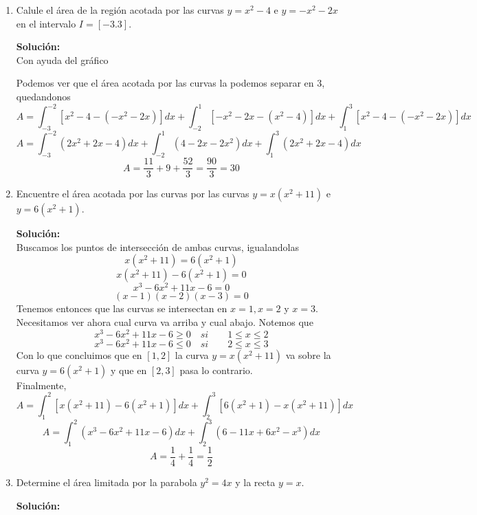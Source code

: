 \documentclass[12pt]{article}
\newenvironment{solucion}
{\begin{mdframed}[backgroundcolor=black!10]
		{\bf Solución:}\\
	}
	{
	\end{mdframed}
}
\newenvironment{preguntas}
{\begin{enumerate}\itemsep12pt
	}
	{
	\end{enumerate}
}
\begin{document}
\begin{preguntas}
\item Calule el área de la región acotada por las curvas $y=x^2-4$ e $y = -x^2-2x$ en el intervalo $I =  [-3.3]$.
\begin{solucion}
Con ayuda del gráfico
		\begin{center}
		\end{center}
		Podemos ver que el área acotada por las curvas la podemos separar en 3, quedandonos
		$$A = \displaystyle\int_{-3}^{-2}[x^2-4-(-x^2-2x)]dx 
		+ \displaystyle\int_{-2}^{1}[-x^2-2x-(x^2-4)]dx 
		+ \displaystyle\int_{1}^{3}[x^2-4-(-x^2-2x)]dx$$
		$$A = \displaystyle\int_{-3}^{-2}(2x^2+2x-4)dx 
		+ \displaystyle\int_{-2}^{1}(4-2x-2x^2)dx 
		+ \displaystyle\int_{1}^{3}(2x^2+2x-4)dx$$
		$$A = \dfrac{11}{3} + 9 + \dfrac{52}{3} = \dfrac{90}{3} = 30$$
\end{solucion}
\item Encuentre el área acotada por las curvas por las curvas $y=x(x^2+11)$ e $y=6(x^2+1)$.
\begin{solucion}
Buscamos los puntos de intersección de ambas curvas, igualandolas
		$$x(x^2+11) = 6(x^2+1)$$
		$$x(x^2+11) - 6(x^2+1) = 0$$
		$$x^3-6x^2+11x-6 = 0$$
		$$(x-1)(x-2)(x-3)=0$$
		Tenemos entonces que las curvas se intersectan en $x=1, x=2$ y $x=3$.\\
		Necesitamos ver ahora cual curva va arriba y cual abajo. Notemos que
		$$x^3-6x^2+11x-6 \geq 0\quad si \qquad 1 \leq x \leq 2$$
		$$x^3-6x^2+11x-6 \leq 0\quad si \qquad 2 \leq x \leq 3$$
		Con lo que concluimos que en $[1,2]$ la curva $y=x(x^2+11)$ va sobre la curva $y=6(x^2+1)$ y que en $[2,3]$ pasa lo contrario.\\
		Finalmente,
		$$A = \displaystyle\int_{1}^{2}[x(x^2+11) - 6(x^2+1)]dx 
		+ \displaystyle\int_{2}^{3}[6(x^2+1) - x(x^2+11)]dx$$ 
		$$A = \displaystyle\int_{1}^{2}(x^3-6x^2+11x-6)dx 
		+ \displaystyle\int_{2}^{3}(6-11x+6x^2-x^3)dx$$ 
		$$A = \dfrac{1}{4} + \dfrac{1}{4} = \dfrac{1}{2}$$
\end{solucion}
\item Determine el área limitada por la parabola $y^2=4x$ y la recta $y=x$.
\begin{solucion}
\begin{center}
\end{center}
\end{solucion}
\end{preguntas}
\end{document}
